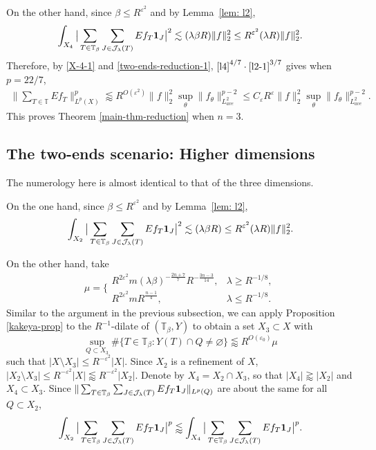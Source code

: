 \documentclass{amsart}
\numberwithin{equation}{section}
\newcommand{\be}{\beta}
\newcommand{\e}{\varepsilon}
\newcommand{\la}{\lambda}
\newcommand{\cj}{\mathcal J}
\newcommand{\ZT}{\mathbb{T}}
\newcommand{\Id}{{\bf 1}}
\begin{document}
On the other hand, since $\be\leq R^{\e^2}$ and by Lemma~\ref{lem: l2},  
\begin{equation}
\label{l2-1}
    \int_{X_4}\big|\sum_{T\in\ZT_\be}\sum_{J\in\cj_\la(T)}Ef_{T}\Id_J\big|^2\lesssim (\la\be R)\|f\|_2^2\leq R^{\e^2}(\la R)\|f\|_2^2.
\end{equation}
Therefore, by \eqref{X-4-1} and \eqref{two-ends-reduction-1}, $\eqref{l4}^{4/7}\cdot\eqref{l2-1}^{3/7}$ gives when $p=22/7$,
\begin{align}
    \big\|\sum_{T\in\ZT}Ef_T\big\|_{L^p(X)}^p\lessapprox R^{O(\e^2)} \|f\|_2^2\sup_\theta\|f_\theta\|_{L^2_{ave}}^{p-2}\leq C_\e R^{\e}\|f\|_2^2\sup_\theta\|f_\theta\|_{L^2_{ave}}^{p-2}.
\end{align}
This proves Theorem \ref{main-thm-reduction} when $n=3$.

\medskip

\subsection{The two-ends scenario: Higher dimensions}

The numerology here is almost identical to that of the three dimensions. 

On the one hand, since $\be\leq R^{\e^2}$ and by Lemma~\ref{lem: l2},  
\begin{equation}
\label{l2-2}
    \int_{X_2}\big|\sum_{T\in\ZT_\be}\sum_{J\in\cj_\la(T)}Ef_{T}\Id_J\big|^2\lesssim (\la \be R)\leq R^{\e^2}(\la R)\|f\|_2^2.
\end{equation}

On the other hand, take 
\begin{equation}
\label{mu-high-d}
    \mu=\Big\{\begin{array}{lc}
    R^{2\e^2}m(\la\be)^{-\frac{2n+7}{7}}R^{-\frac{3n-3}{14}} ,    &  \la\geq R^{-1/8},\\[.5ex]
    R^{2\e^2}m R^{\frac{n-1}{4}},      &  \la\leq R^{-1/8}.
    \end{array}
\end{equation}
Similar to the argument in the previous subsection, we can apply Proposition \ref{kakeya-prop} to the $R^{-1}$-dilate of $(\ZT_\be, Y)$ to obtain a set $X_3\subset X$ with
\begin{equation}
    \sup_{Q\subset X_3}\#\{T\in\ZT_\be:Y(T)\cap Q\not=\varnothing\}\lessapprox R^{O(\e_0)}\mu
\end{equation}
such that $|X\setminus X_3|\leq R^{-\e^2}|X|$. 
Since $X_2$ is a refinement of $X$, $|X_2\setminus X_3|\leq R^{-\e^2}|X|\lessapprox R^{-\e^2}|X_2|$. 
Denote by $X_4=X_2\cap X_3$, so that $|X_4|\gtrapprox|X_2|$ and $X_4\subset X_3$. 
Since $\|\sum_{T\in\ZT_\be}\sum_{J\in\cj_{\la}(T)}Ef_{T}\Id_J\|_{L^p(Q)}$ are about the same for all $Q\subset X_2$,
\begin{equation}
\label{X-4-2}
    \int_{X_2}\big|\sum_{T\in\ZT_\be}\sum_{J\in\cj_\la(T)}Ef_{T}\Id_J\big|^p\lessapprox\int_{X_4}\big|\sum_{T\in\ZT_\be}\sum_{J\in\cj_\la(T)}Ef_{T}\Id_J\big|^p.
\end{equation}
\end{document}
